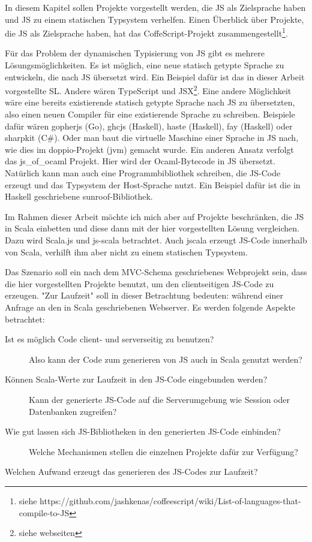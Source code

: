 \documentclass[12pt,bibtotoc]{scrreprt}
\begin{document}
In diesem Kapitel sollen Projekte vorgestellt werden, die JS als Zielsprache haben und JS zu einem statischen Typsystem verhelfen. Einen Überblick über Projekte, die JS als Zielsprache haben, hat das CoffeScript-Projekt zusammengestellt\footnote{siehe https://github.com/jashkenas/coffeescript/wiki/List-of-languages-that-compile-to-JS}. 

Für das Problem der dynamischen Typisierung von JS gibt es mehrere Lösungsmöglichkeiten. Es ist möglich, eine neue statisch getypte Sprache zu entwickeln, die nach JS übersetzt wird. Ein Beispiel dafür ist das in dieser Arbeit vorgestellte SL. Andere wären TypeScript und JSX\footnote{siehe webseiten}. Eine andere Möglichkeit wäre eine bereits existierende statisch getypte Sprache nach JS zu übersetzten, also einen neuen Compiler für eine existierende Sprache zu schreiben. Beispiele dafür wären gopherjs (Go), ghcjs (Haskell), haste (Haskell), fay (Haskell) oder sharpkit (C\#). Oder man baut die virtuelle Maschine einer Sprache in JS nach, wie dies im doppio-Projekt (jvm) gemacht wurde. Ein anderen Ansatz verfolgt das js\_of\_ocaml Projekt. Hier wird der Ocaml-Bytecode in JS übersetzt. Natürlich kann man auch eine Programmbibliothek schreiben, die JS-Code erzeugt und das Typsystem der Host-Sprache nutzt. Ein Beispiel dafür ist die in Haskell geschriebene sunroof-Bibliothek. 

Im Rahmen dieser Arbeit möchte ich mich aber auf Projekte beschränken, die JS in Scala einbetten und diese dann mit der hier vorgestellten Lösung vergleichen. Dazu wird Scala.js und js-scala betrachtet. Auch jscala erzeugt JS-Code innerhalb von Scala, verhilft ihm aber nicht zu einem statischen Typsystem.

Das Szenario soll ein nach dem MVC-Schema geschriebenes Webprojekt sein, dass die hier vorgestellten Projekte benutzt, um den clientseitigen JS-Code zu erzeugen. "Zur Laufzeit" soll in dieser Betrachtung bedeuten: während einer Anfrage an den in Scala geschriebenen Webserver. Es werden folgende Aspekte betrachtet:

\begin{description}
 \item[Ist es möglich Code client- und serverseitig zu benutzen?] Also kann der Code zum generieren von JS auch in Scala genutzt werden?
 \item[Können Scala-Werte zur Laufzeit in den JS-Code eingebunden werden?] Kann der generierte JS-Code auf die Serverumgebung wie Session oder Datenbanken zugreifen?
 \item[Wie gut lassen sich JS-Bibliotheken in den generierten JS-Code einbinden?] Welche Mechanismen stellen die einzelnen Projekte dafür zur Verfügung?
 \item[Welchen Aufwand erzeugt das generieren des JS-Codes zur Laufzeit?]
\end{description}
\end{document}
